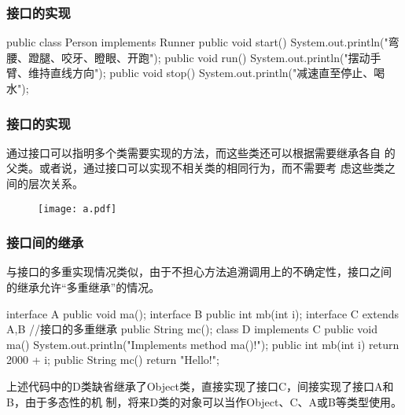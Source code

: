 \begin{frame}[fragile] %
  \frametitle{接口的实现}


  \begin{javaCode}
    public class Person implements Runner {
      public void start() {
        System.out.println("弯腰、蹬腿、咬牙、瞪眼、开跑");
      }
      public void run(){
        System.out.println("摆动手臂、维持直线方向");
      }
      public void stop(){
        System.out.println("减速直至停止、喝水");
      }
    }
  \end{javaCode}
\end{frame}

\begin{frame}[fragile] %
  \frametitle{接口的实现}

  通过接口可以指明多个类需要实现的方法，而这些类还可以根据需要继承各自
  的父类。或者说，{\Red\kai 通过接口可以实现不相关类的相同行为，而不需要考
    虑这些类之间的层次关系。}
  
  \begin{figure}
    \centering
    \texttt{[image: a.pdf]}
  \end{figure}



\end{frame}


\begin{frame}[fragile] %
\frametitle{接口间的继承}

与接口的多重实现情况类似，由于不担心方法追溯调用上的不确定性，接口之间
的继承允许“多重继承”的情况。

\begin{javaCode}
interface A {
  public void ma();
}
interface B {
  public int mb(int i);
}
interface C extends A,B {  //接口的多重继承
  public String mc();
}
class D implements C {
  public void ma() {
    System.out.println("Implements method ma()!");
  }
  public int mb(int i) {
    return 2000 + i;
  }
  public String mc() {
    return "Hello!";
  }
}
\end{javaCode}
{\footnotesize \Mage 上述代码中的D类缺省继承了Object类，直接实现了接口C，间接实现了接口A和B，由于多态性的机
制，将来D类的对象可以当作Object、C、A或B等类型使用。}
\end{frame}

